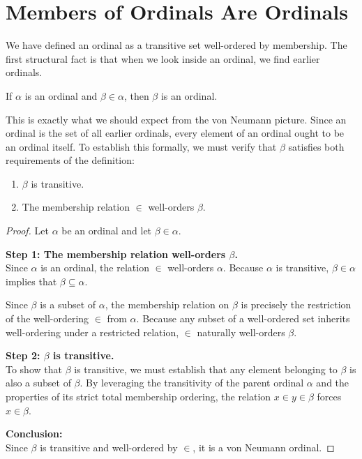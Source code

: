 \documentclass[11pt]{article}
\begin{document}
\section{Members of Ordinals Are Ordinals}

We have defined an ordinal as a transitive set well-ordered by membership. The first structural fact is that when we look inside an ordinal, we find earlier ordinals.

\begin{proposition}
If $\alpha$ is an ordinal and $\beta \in \alpha$, then $\beta$ is an ordinal.
\end{proposition}

This is exactly what we should expect from the von Neumann picture. Since an ordinal is the set of all earlier ordinals, every element of an ordinal ought to be an ordinal itself. To establish this formally, we must verify that $\beta$ satisfies both requirements of the definition:
\begin{enumerate}[label=(\roman*)]
    \item $\beta$ is transitive.
    \item The membership relation $\in$ well-orders $\beta$.
\end{enumerate}

\begin{proof}
Let $\alpha$ be an ordinal and let $\beta \in \alpha$. 

\medskip
\noindent\textbf{Step 1: The membership relation well-orders $\beta$.}\\
Since $\alpha$ is an ordinal, the relation $\in$ well-orders $\alpha$. Because $\alpha$ is transitive, $\beta \in \alpha$ implies that $\beta \subseteq \alpha$. 

Since $\beta$ is a subset of $\alpha$, the membership relation on $\beta$ is precisely the restriction of the well-ordering $\in$ from $\alpha$. Because any subset of a well-ordered set inherits well-ordering under a restricted relation, $\in$ naturally well-orders $\beta$.

\medskip
\noindent\textbf{Step 2: $\beta$ is transitive.}\\
To show that $\beta$ is transitive, we must establish that any element belonging to $\beta$ is also a subset of $\beta$. By leveraging the transitivity of the parent ordinal $\alpha$ and the properties of its strict total membership ordering, the relation $x \in y \in \beta$ forces $x \in \beta$.


\medskip
\noindent\textbf{Conclusion:}\\
Since $\beta$ is transitive and well-ordered by $\in$, it is a von Neumann ordinal.
\end{proof}
\end{document}
